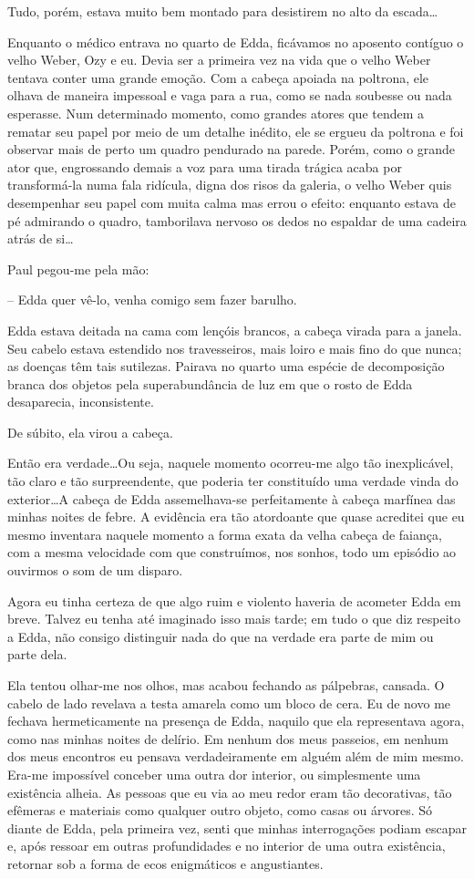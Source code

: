 Tudo, porém, estava muito bem montado para desistirem no alto da escada\dots

Enquanto o médico entrava no quarto de Edda, ficávamos no aposento contíguo o velho Weber, Ozy e eu.
Devia ser a primeira vez na vida que o velho Weber tentava conter uma grande emoção. Com a cabeça apoiada na poltrona, ele olhava de maneira impessoal e vaga para a rua, como se nada soubesse ou nada esperasse. Num determinado momento, como grandes atores que tendem a rematar seu papel por meio de um detalhe inédito, ele se ergueu da poltrona e foi observar mais de perto um quadro pendurado na parede. Porém, como o grande ator que, engrossando demais a voz para uma tirada trágica acaba por transformá-la numa fala ridícula, digna dos risos da galeria, o velho Weber quis desempenhar seu papel com muita calma mas errou o efeito: enquanto estava de pé admirando o quadro, tamborilava nervoso os dedos no espaldar de uma cadeira atrás de si\dots

Paul pegou-me pela mão:

-- Edda quer vê-lo, venha comigo sem fazer barulho.

Edda estava deitada na cama com lençóis brancos, a cabeça virada para a janela. Seu cabelo estava estendido nos travesseiros, mais loiro e mais fino do que nunca; as doenças têm tais sutilezas. Pairava no quarto uma espécie de decomposição branca dos objetos pela superabundância de luz em que o rosto de Edda desaparecia, inconsistente.

De súbito, ela virou a cabeça.

Então era verdade\dots Ou seja, naquele momento ocorreu-me algo tão inexplicável, tão claro e tão surpreendente, que poderia ter constituído uma verdade vinda do exterior\dots A cabeça de Edda assemelhava-se perfeitamente à cabeça marfínea das minhas noites de febre. A evidência era tão atordoante que quase acreditei que eu mesmo inventara naquele momento a forma exata da velha cabeça de faiança, com a mesma velocidade com que construímos, nos sonhos, todo um episódio ao ouvirmos o som de um disparo.  

Agora eu tinha certeza de que algo ruim e violento haveria de acometer Edda em breve. Talvez eu tenha até imaginado isso mais tarde; em tudo o que diz respeito a Edda, não consigo distinguir nada do que na verdade era parte de mim ou parte dela.

Ela tentou olhar-me nos olhos, mas acabou fechando as pálpebras, cansada. O cabelo de lado revelava a testa amarela como um bloco de cera. Eu de novo me fechava hermeticamente na presença de Edda, naquilo que ela representava agora, como nas minhas noites de delírio. Em nenhum dos meus passeios, em nenhum dos meus encontros eu pensava verdadeiramente em alguém além de mim mesmo. Era-me impossível conceber uma outra dor interior, ou simplesmente uma existência alheia. As pessoas que eu via ao meu redor eram tão decorativas, tão efêmeras e materiais como qualquer outro objeto, como casas ou árvores. Só diante de Edda, pela primeira vez, senti que minhas interrogações podiam escapar e, após ressoar em outras profundidades e no interior de uma outra existência, retornar sob a forma de ecos enigmáticos e angustiantes.


